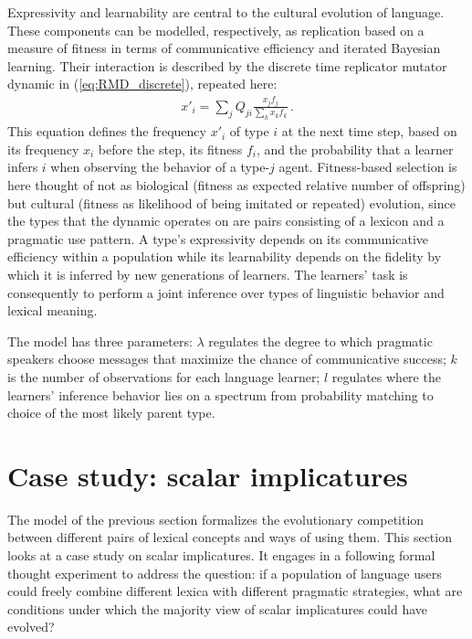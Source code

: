 \documentclass[a4paper, 11pt]{article}
\theoremstyle{Satz}
\begin{document}
Expressivity and learnability are central to the cultural evolution of language. These
components can be modelled, respectively, as replication based on a measure of fitness in terms
of communicative efficiency and iterated Bayesian learning. Their interaction is described by
the discrete time replicator mutator dynamic in (\ref{eq:RMD_discrete}), repeated here:
\begin{align*}
  x'_i = \sum_j Q_{ji} \frac{x_jf_j}{\sum_k x_k f_k}\,.
\end{align*}
This equation defines the frequency $x'_i$ of type $i$ at the next time step, based on its
frequency $x_i$ before the step, its fitness $f_i$, and the probability that a learner infers
$i$ when observing the behavior of a type-$j$ agent. Fitness-based selection is here thought of
not as biological (fitness as expected relative number of offspring) but cultural (fitness as
likelihood of being imitated or repeated) evolution, since the types that the dynamic operates
on are pairs consisting of a lexicon and a pragmatic use pattern. A type's expressivity depends
on its communicative efficiency within a population while its learnability depends on the
fidelity by which it is inferred by new generations of learners. The learners' task is
consequently to perform a joint inference over types of linguistic behavior and lexical
meaning.

The model has three parameters: $\lambda$ regulates the degree to which pragmatic speakers
choose messages that maximize the chance of communicative success; $k$ is the number of
observations for each language learner; $l$ regulates where the learners' inference behavior
lies on a spectrum from probability matching to choice of the most likely parent type.


\section{Case study: scalar implicatures}
\label{sec:si-case-study}

The model of the previous section formalizes the evolutionary competition between different
pairs of lexical concepts and ways of using them. This section looks at a case study on scalar
implicatures. It engages in a following formal thought experiment to address the question: if a
population of language users could freely combine different lexica with different pragmatic
strategies, what are conditions under which the majority view of scalar implicatures could have
evolved?
\end{document}
